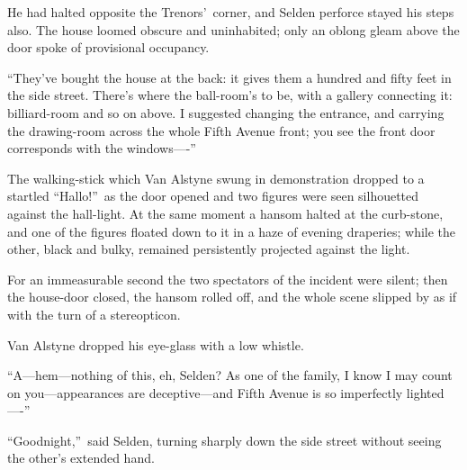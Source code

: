 \documentclass[12pt,a4paper]{book}
\begin{document}
He had halted opposite the Trenors'\ corner, and Selden perforce
stayed his steps also. The house loomed obscure and uninhabited;
only an oblong gleam above the door spoke of provisional
occupancy.





``They've bought the house at the back: it gives them a hundred
and fifty feet in the side street. There's where the ball-room's
to be, with a gallery connecting it: billiard-room and so on
above. I suggested changing the entrance, and carrying the
drawing-room across the whole Fifth Avenue front; you see the
front door corresponds with the windows----''





The walking-stick which Van Alstyne swung in demonstration
dropped to a startled ``Hallo!''\ as the door opened and two figures
were seen silhouetted against the hall-light. At the same moment
a hansom halted at the curb-stone, and one of the figures floated
down to it in a haze of evening draperies; while the other, black
and bulky, remained persistently projected against the light.





For an immeasurable second the two spectators of the incident
were silent; then the house-door closed, the hansom rolled off,
and the whole scene slipped by as if with the turn of a
stereopticon.





Van Alstyne dropped his eye-glass with a low whistle.





``A---hem---nothing of this, eh, Selden? As one of the family, I
know I may count on you---appearances are deceptive---and Fifth
Avenue is so imperfectly lighted----''





``Goodnight,''\ said Selden, turning sharply down the side street
without seeing the other's extended hand.
\end{document}
